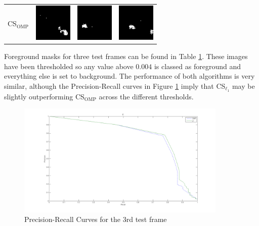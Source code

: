 \begin{table}[ht!]
\begin{tabular}{cccc}
\parbox[top]{18mm}{CS$_{\text{OMP}}$} & \includegraphics[width=18mm]{1o}& \includegraphics[width=18mm]{2o} & \includegraphics[width=18mm]{3o} \\
\end{tabular}
\label{tab:gt}
\end{table}


Foreground masks for three test frames can be found in Table \ref{tab:gt}. These images have been thresholded so any value above $0.004$ is classed as foreground and everything else is set to background. The performance of both algorithms is very similar, although the Precision-Recall curves in Figure \ref{fig:precrec} imply that CS$_{\ell_1}$ may be slightly outperforming CS$_{\text{OMP}}$ across the different thresholds. 

\begin{figure}[t]
  \centering
  \includegraphics[width = 10cm]{Epr}
  \caption{Precision-Recall Curves for the 3rd test frame}
  \label{fig:precrec}
\end{figure}

